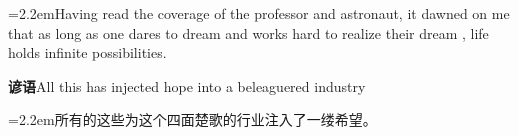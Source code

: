 \documentclass[11pt,a4paper]{article}
\newcommand{\num}[1]{\makebox[1.9em][r]{#1.}\hspace{0.3em}}
\begin{document}
\vspace{0.15em}

\noindent\hangindent=2.2em\hspace{2.2em}Having read the coverage of the professor and astronaut, it dawned on me that as long as one dares to dream and works hard to realize their dream , life holds infinite possibilities.

\vspace{0.4em}\noindent{\color{rulegray}\rule{\textwidth}{0.6pt}}\vspace{0.4em}

\num{5}\textbf{谚语}\quad All this has injected hope into a beleaguered industry

\vspace{0.15em}

\noindent\hangindent=2.2em\hspace{2.2em}所有的这些为这个四面楚歌的行业注入了一缕希望。
\end{document}

